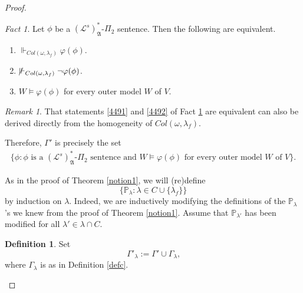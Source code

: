 \documentclass[12pt, twoside]{memoir}
\numberwithin{equation}{section}
\theoremstyle{definition}
\newtheorem{defi}[thm]{Definition}
\theoremstyle{remark}
\newtheorem{rem}[thm]{Remark}
\newtheorem{fact}[thm]{Fact}
\theoremstyle{definition}
\theoremstyle{definition}
\theoremstyle{definition}
\theoremstyle{remark}
\begin{document}
\begin{proof}
\begin{fact}\label{fact449}
Let $\phi$ be a $(\mathcal{L}^s)^*_{\mathfrak{A}}$-$\Pi_2$ sentence. Then the following are equivalent.
\begin{enumerate}[label=(\arabic*)$_{\phi}$]
    \item\label{4491} $\Vdash_{Col(\omega, \lambda_f)} \varphi(\phi)$.
    \item\label{4492} $\mspace{-3mu}\not \mspace{3mu}\Vdash_{Col(\omega, \lambda_f)} \neg \varphi(\phi)$.
    \item $W \models \varphi(\phi)$ for every outer model $W$ of $V$.
\end{enumerate}
\end{fact}

\begin{rem}
That statements \ref{4491} and \ref{4492} of Fact \ref{fact449} are equivalent can also be derived directly from the homogeneity of $Col(\omega, \lambda_f)$.
\end{rem}

Therefore, $\Gamma'$ is precisely the set 
\begin{align*}
    \{\phi : \phi \text{ is a } (\mathcal{L}^s)^*_{\mathfrak{A}}\text{-}\Pi_2 \text{ sentence and } W \models \varphi(\phi) \text{ for every outer model } W \text{ of } V\} \text{.}
\end{align*}

As in the proof of Theorem \ref{notion1}, we will (re)define $$\{\mathbb{P}_{\lambda} : \lambda \in C \cup \{\lambda_f\}\}$$ by induction on $\lambda$. Indeed, we are inductively modifying the definitions of the $\mathbb{P}_{\lambda}$'s we knew from the proof of Theorem \ref{notion1}. Assume that $\mathbb{P}_{\lambda'}$ has been modified for all $\lambda' \in \lambda \cap C$. 

\begin{defi}\label{def447}
Set
\begin{equation*}
    \Gamma'_{\lambda} := \Gamma' \cup \Gamma_{\lambda} \text{,}
\end{equation*}
where $\Gamma_{\lambda}$ is as in Definition \ref{defc}. 
\end{defi}


\end{proof}
\end{document}

